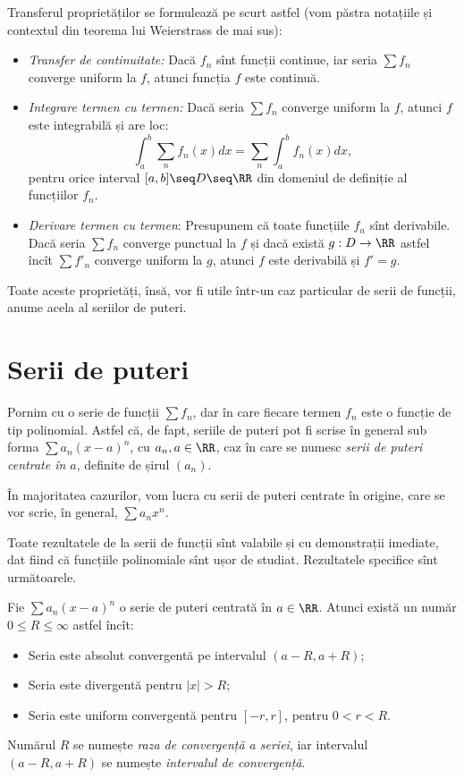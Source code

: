Transferul proprietăților se formulează pe scurt astfel (vom păstra notațiile
și contextul din teorema lui Weierstrass de mai sus):
\begin{itemize}
\item \emph{Transfer de continuitate:} Dacă $ f_n $ sînt funcții continue,
  iar seria $ \sum f_n $ converge uniform la $ f $, atunci funcția $ f $
  este continuă.
\item \emph{Integrare termen cu termen:} Dacă seria $ \sum f_n $ converge
  uniform la $ f $, atunci $ f $ este integrabilă și are loc:
  \[
    \int_a^b \sum_n f_n(x) dx = \sum_n \int_a^b f_n(x) dx,
  \]
  pentru orice interval $ [a, b] \seq D \seq \RR $ din domeniul de
  definiție al funcțiilor $ f_n $.
\item \emph{Derivare termen cu termen}: Presupunem că toate funcțiile
  $ f_n $ sînt derivabile. Dacă seria $ \sum f_n $ converge punctual
  la $ f $ și dacă există $ g : D \to \RR $ astfel încît $ \sum f'_n $
  converge uniform la $ g $, atunci $ f $ este derivabilă și $ f' = g $.
\end{itemize}

Toate aceste proprietăți, însă, vor fi utile într-un caz particular de serii de
funcții, anume acela al seriilor de puteri.



\section{Serii de puteri}

Pornim cu o serie de funcții $ \sum f_n $, dar în care fiecare termen $ f_n $
este o funcție de tip polinomial. Astfel că, de fapt, seriile de puteri
pot fi scrise în general sub forma $ \sum a_n(x - a)^n $, cu $ a_n, a \in \RR $,
caz în care se numesc \emph{serii de puteri centrate în $ a $}, definite de
șirul $ (a_n) $.

În majoritatea cazurilor, vom lucra cu serii de puteri centrate în origine,
care se vor scrie, în general, $ \sum a_n x^n $.

Toate rezultatele de la serii de funcții sînt valabile și cu demonstrații imediate,
dat fiind că funcțiile polinomiale sînt ușor de studiat. Rezultatele specifice
sînt următoarele.

\begin{theorem}[Abel]\label{thm:abel}
  Fie $ \sum a_n (x - a)^n $ o serie de puteri centrată în $ a \in \RR $. Atunci
  există un număr $ 0 \leq R \leq \infty $ astfel încît:
  \begin{itemize}
  \item Seria este absolut convergentă pe intervalul $ (a - R, a + R) $;
  \item Seria este divergentă pentru $ |x| > R $;
  \item Seria este uniform convergentă pentru $ [-r, r] $, pentru $ 0 < r < R $.
  \end{itemize}
  Numărul $ R $ se numește \emph{raza de convergență a seriei}, iar intervalul
  $ (a - R, a + R) $ se numește \emph{intervalul de convergență}.
\end{theorem}

